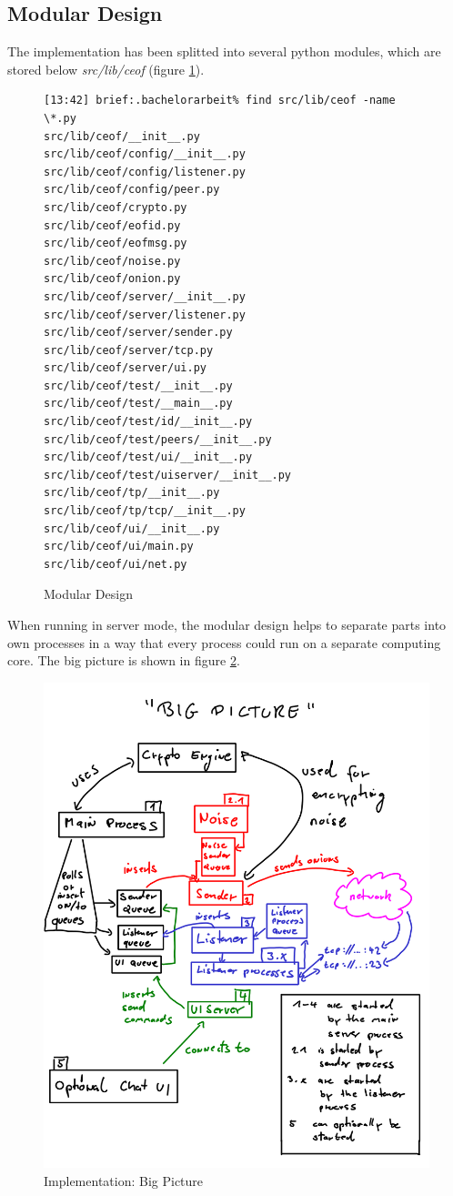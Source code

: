\subsection{Modular Design}
The implementation has been splitted into several python
modules, which are stored below \textit{src/lib/ceof} 
(figure \ref{pythonmodules}).
\begin{figure}[htbp]
\caption{Modular Design}
\label{pythonmodules}
\begin{verbatim}
[13:42] brief:.bachelorarbeit% find src/lib/ceof -name \*.py
src/lib/ceof/__init__.py
src/lib/ceof/config/__init__.py
src/lib/ceof/config/listener.py
src/lib/ceof/config/peer.py
src/lib/ceof/crypto.py
src/lib/ceof/eofid.py
src/lib/ceof/eofmsg.py
src/lib/ceof/noise.py
src/lib/ceof/onion.py
src/lib/ceof/server/__init__.py
src/lib/ceof/server/listener.py
src/lib/ceof/server/sender.py
src/lib/ceof/server/tcp.py
src/lib/ceof/server/ui.py
src/lib/ceof/test/__init__.py
src/lib/ceof/test/__main__.py
src/lib/ceof/test/id/__init__.py
src/lib/ceof/test/peers/__init__.py
src/lib/ceof/test/ui/__init__.py
src/lib/ceof/test/uiserver/__init__.py
src/lib/ceof/tp/__init__.py
src/lib/ceof/tp/tcp/__init__.py
src/lib/ceof/ui/__init__.py
src/lib/ceof/ui/main.py
src/lib/ceof/ui/net.py
\end{verbatim}
\end{figure}
When running in server mode, the modular design helps
to separate parts into own processes in a way that
every process could run on a separate computing
core. The big picture is shown in figure \ref{bigpicture}.
\begin{figure}[htbp]
\caption{Implementation: Big Picture}
\label{bigpicture}
\includegraphics[scale=0.8]{bigpicture.png}
\end{figure}
